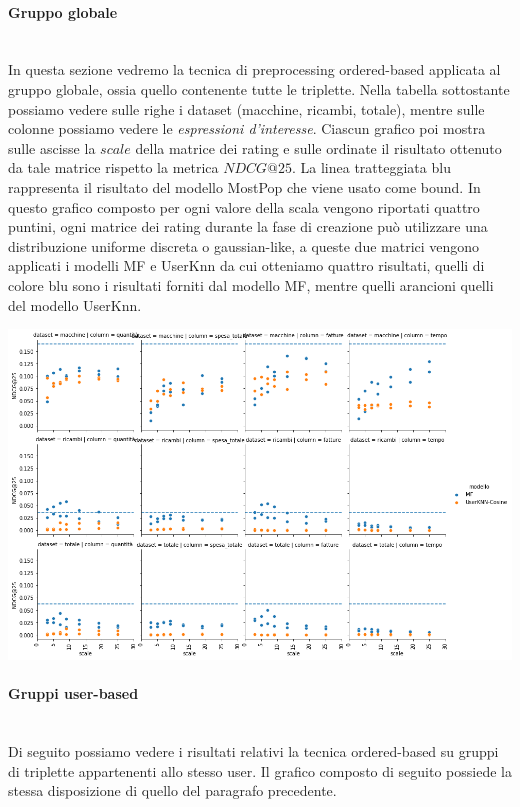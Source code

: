 \paragraph{Gruppo globale}\mbox{} \\
In questa sezione vedremo la tecnica di preprocessing ordered-based applicata al gruppo globale, ossia quello contenente tutte le triplette.
Nella tabella sottostante possiamo vedere sulle righe i dataset (macchine, ricambi, totale), mentre sulle colonne possiamo vedere le \textit{espressioni d'interesse}. Ciascun grafico poi mostra sulle ascisse la $scale$ della matrice dei rating e sulle ordinate il risultato ottenuto da tale matrice rispetto la metrica $NDCG@25$. La linea tratteggiata blu rappresenta il risultato del modello MostPop che viene usato come bound.
In questo grafico composto per ogni valore della scala vengono riportati quattro puntini, ogni matrice dei rating durante la fase di creazione può utilizzare una distribuzione uniforme discreta o gaussian-like, a queste due matrici vengono applicati i modelli MF e UserKnn da cui otteniamo quattro risultati, quelli di colore blu sono i risultati forniti dal modello MF, mentre quelli arancioni quelli del modello UserKnn.

\includegraphics[width=16cm]{figures/risultati_ordered_globale.png}

\paragraph{Gruppi user-based}\mbox{} \\
Di seguito possiamo vedere i risultati relativi la tecnica ordered-based su gruppi di triplette appartenenti allo stesso user.
Il grafico composto di seguito possiede la stessa disposizione di quello del paragrafo precedente.\\

